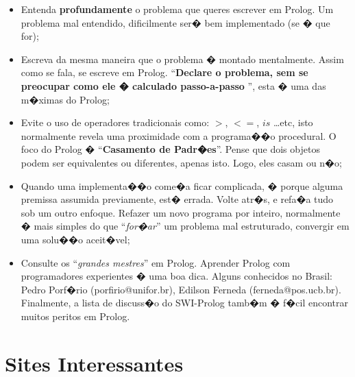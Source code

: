 \documentclass[final,a4paper]{article}
\begin{document}
\begin{itemize}
\item Entenda {\bf profundamente} o problema
que queres escrever em Prolog. Um
problema mal entendido, dificilmente
ser� bem implementado (se � que for);

\item Escreva da mesma maneira que o
problema � montado mentalmente. Assim
como se fala, se escreve em Prolog.
``{\bf Declare o problema, sem se preocupar como
ele � calculado passo-a-passo }'', esta � uma das m�ximas do
Prolog;

\item Evite o uso de operadores
tradicionais como: $>$, $<=$, $is$ \ldots etc, isto
normalmente revela uma proximidade com a
programa��o procedural. O foco do Prolog
� \/ ``{\bf Casamento de Padr�es}''. Pense
que dois objetos podem ser equivalentes
ou diferentes, apenas isto.
Logo, eles casam ou n�o;

\item Quando uma implementa��o come�a
ficar complicada, � porque alguma premissa assumida
previamente, est� errada. Volte atr�s, e
refa�a tudo sob um outro enfoque.
Refazer um novo programa por inteiro, normalmente
� mais simples do que ``{\em for�ar}''
um problema mal estruturado, convergir
em uma solu��o aceit�vel;

\item Consulte os ``{\em grandes
mestres}'' em Prolog. Aprender Prolog
com programadores experientes � uma
boa dica. Alguns conhecidos no Brasil:
Pedro Porf�rio (porfirio@unifor.br),
Edilson Ferneda (ferneda@pos.ucb.br).
Finalmente, a lista de discuss�o do
SWI-Prolog tamb�m � f�cil encontrar
muitos peritos em Prolog.

\end{itemize}



\section{Sites Interessantes \label{sites}}
\end{document}
